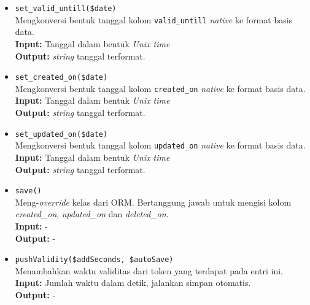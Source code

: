\begin{itemize}
\begin{itemize}
                \item \texttt{set\_valid\_untill(\$date)} \\
                    Mengkonversi bentuk tanggal kolom \texttt{valid\_untill}
                    \textit{native} ke format basis data. \\
                    \textbf{Input:} Tanggal dalam bentuk \textit{Unix time}\\
                    \textbf{Output:} \textit{string} tanggal terformat.
                    
                \item \texttt{set\_created\_on(\$date)} \\
                    Mengkonversi bentuk tanggal kolom \texttt{created\_on}
                    \textit{native} ke format basis data. \\
                    \textbf{Input:} Tanggal dalam bentuk \textit{Unix time}\\
                    \textbf{Output:} \textit{string} tanggal terformat.
                
                \item \texttt{set\_updated\_on(\$date)} \\
                    Mengkonversi bentuk tanggal kolom \texttt{updated\_on}
                    \textit{native} ke format basis data. \\
                    \textbf{Input:} Tanggal dalam bentuk \textit{Unix time}\\
                    \textbf{Output:} \textit{string} tanggal terformat.
                    
                    
                \item \texttt{save()}\\
                    Meng-\textit{override} kelas dari ORM. Bertanggung jawab
                    untuk mengisi kolom \textit{created\_on},
                    \textit{updated\_on} dan \textit{deleted\_on}.\\
                    \textbf{Input:} -\\
                    \textbf{Output:} -
                
                \item \texttt{pushValidity(\$addSeconds, \$autoSave)} \\
                    Menambahkan waktu validitas dari token yang terdapat pada
                    entri ini. \\
                    \textbf{Input:} Jumlah waktu dalam detik, jalankan simpan
                    otomatis.\\
                    \textbf{Output:} -
            \end{itemize}
    \end{itemize}

